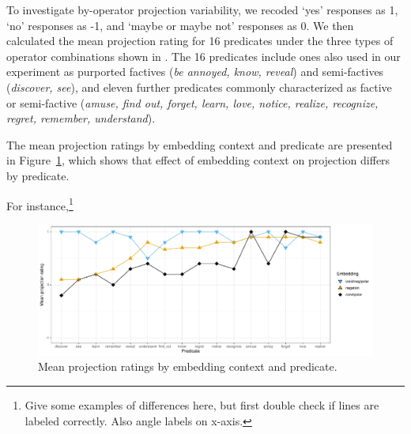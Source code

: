 \documentclass[a4paper,12pt,twoside]{article}
\begin{document}
To investigate by-operator projection variability, we recoded `yes' responses as 1, `no' responses as -1, and `maybe or maybe not' responses as 0. We then calculated the mean projection rating for 16 predicates under the three types of operator combinations shown in \Last. The 16 predicates include ones also used in our experiment as purported factives (\textit{be annoyed, know, reveal}) and semi-factives (\textit{discover, see}), and eleven further predicates commonly characterized as factive or semi-factive (\textit{amuse, find out, forget, learn, love, notice, realize, recognize, regret, remember, understand}).


			The mean projection ratings by embedding context and predicate are presented in Figure~\ref{fig:figure4}, which shows that effect of embedding context on projection differs by predicate.

			For instance,\footnote{Give some examples of differences here, but first double check if lines are labeled correctly. Also angle labels on x-axis.}


			\begin{figure}[ht]
				\centering
				\includegraphics[width = \linewidth]{mega-veridicality}
				\caption{Mean projection ratings by embedding context and predicate.}
				\label{fig:figure4}
			\end{figure}
\end{document}
